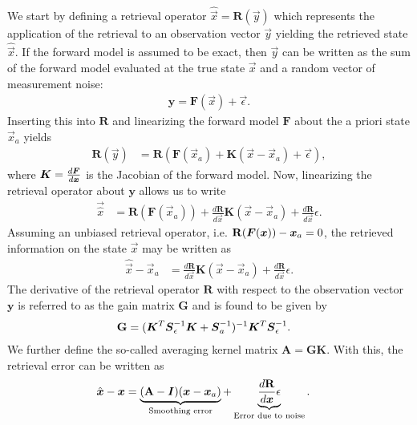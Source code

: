 We start by defining a retrieval operator $\hat{\vec{x}} = \mathbf{R}(\vec{y})$
which represents the application of the retrieval to an observation vector
$\vec{y}$ yielding the retrieved state $\hat{\vec{x}}$. If the forward model is
assumed to be exact, then $\vec{y}$ can be written as the sum of the forward
model evaluated at the true state $\vec{x}$ and a random vector of measurement
noise:
\begin{align}
  \mathbf{y} = \mathbf{F}(\vec{x}) + \vec{\epsilon}.
\end{align}
Inserting this into $\mathbf{R}$ and linearizing the forward model $\mathbf{F}$ about the a
priori state $\vec{x}_a$ yields
\begin{align}
  \mathbf{R}(\vec{y}) &= \mathbf{R} \left (\mathbf{F}(\vec{x}_a) + \mathbf{K}(\vec{x} - \vec{x}_a) + \vec{\epsilon} \right),
\end{align}
where $\boldsymbol{K} = \frac{d\boldsymbol{F}}{d\boldsymbol{x}}$ is the Jacobian of the forward model.
Now, linearizing the retrieval operator  about $\mathbf{y}$ allows us to write
\begin{align}
 \vec{\hat{x}}  &= \mathbf{R}(\mathbf{F}(\vec{x}_a)) +  \frac{d\mathbf{R}}{d\vec{x}}\mathbf{K}(\vec{x} - \vec{x}_a) + \frac{d\mathbf{R}}{d\vec{x}} \epsilon.
\end{align}
Assuming an unbiased retrieval operator, i.e. $\mathbf{R}(\boldsymbol{F}(\boldsymbol{x})) - \boldsymbol{x}_a = 0$, the retrieved
information on the state $\vec{x}$ may be written as
\begin{align}
\hat{\vec{x}} - \vec{x}_a &=  \frac{d\mathbf{R}}{d\vec{x}}\mathbf{K}(\vec{x} - \vec{x}_a) + \frac{d\mathbf{R}}{d\vec{x}} \epsilon.
\end{align}
The derivative of the retrieval operator $\mathbf{R}$ with respect to the observation vector $\mathbf{y}$
is referred to as the gain matrix $\mathbf{G}$ and is found to be given by
\begin{align}
  \mathbf{G} &= (\boldsymbol{K}^T\boldsymbol{S}_\epsilon^{-1}\boldsymbol{K} + \boldsymbol{S}_a^{-1})^{-1} \boldsymbol{K}^T\boldsymbol{S}^{-1}_\epsilon.
\end{align}
We further define the so-called averaging kernel matrix $\mathbf{A} = \mathbf{G}\mathbf{K}$. With
this, the retrieval error can be written as
\begin{align}\label{eq:retrieval_error}
  \hat{\boldsymbol{x}} - \boldsymbol{x} &=  \underbrace{(\mathbf{A} - \boldsymbol{I})(\boldsymbol{x} - \boldsymbol{x}_a)}_{\text{Smoothing error}}
  + \underbrace{\frac{d\mathbf{R}}{d\boldsymbol{x}} \epsilon}_{\text{Error due to noise}}.
\end{align}
